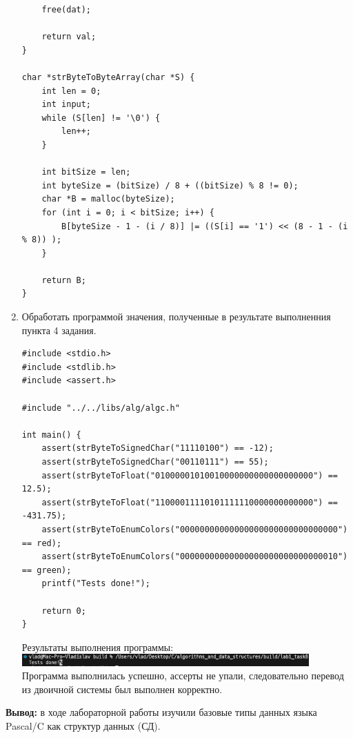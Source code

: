 \documentclass[a4paper,14pt]{extarticle}
\begin{document}
\begin{enumerate}
\begin{verbatim}
    free(dat);

    return val;
}

char *strByteToByteArray(char *S) {
    int len = 0;
    int input;
    while (S[len] != '\0') {
        len++;
    }
    
    int bitSize = len;
    int byteSize = (bitSize) / 8 + ((bitSize) % 8 != 0);
    char *B = malloc(byteSize);
    for (int i = 0; i < bitSize; i++) {
        B[byteSize - 1 - (i / 8)] |= ((S[i] == '1') << (8 - 1 - (i % 8)) );
    }
    
    return B;
}
\end{verbatim}
\item Обработать программой значения, полученные в результате выполненния пункта 4 задания.
\begin{verbatim}
#include <stdio.h>
#include <stdlib.h>
#include <assert.h>

#include "../../libs/alg/algc.h"

int main() {
    assert(strByteToSignedChar("11110100") == -12);
    assert(strByteToSignedChar("00110111") == 55);
    assert(strByteToFloat("01000001010010000000000000000000") == 12.5);
    assert(strByteToFloat("11000011110101111110000000000000") == -431.75);
    assert(strByteToEnumColors("00000000000000000000000000000000") == red);
    assert(strByteToEnumColors("00000000000000000000000000000010") == green);
    printf("Tests done!");

    return 0;
}
\end{verbatim}
Результаты выполнения программы:\\
\includegraphics[width=110mm]{8}\\
Программа выполнилась успешно, ассерты не упали, следовательно перевод из двоичной системы был выполнен корректно.
\end{enumerate}
\textbf{Вывод: } в ходе лабораторной работы изучили базовые типы данных языка Pascal/C как структур данных (СД).
\end{document}
